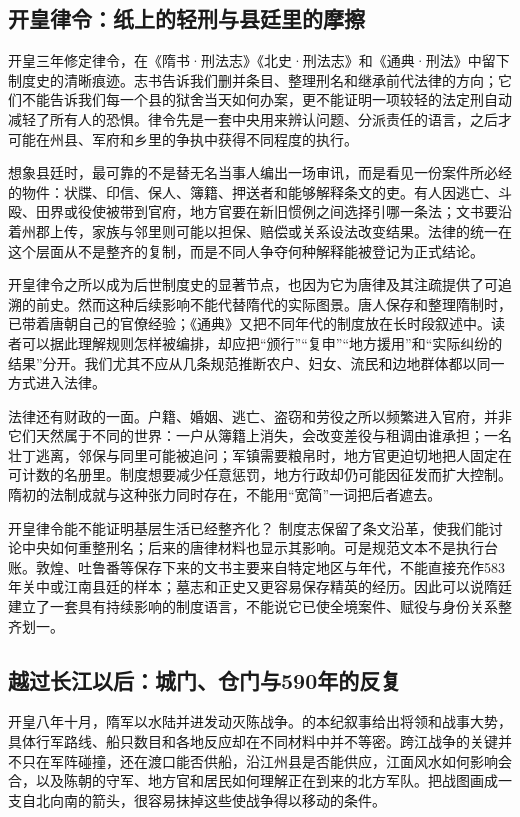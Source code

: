 \subsection{开皇律令：纸上的轻刑与县廷里的摩擦}
开皇三年修定律令，在《隋书·刑法志》《北史·刑法志》和《通典·刑法》中留下制度史的清晰痕迹。志书告诉我们删并条目、整理刑名和继承前代法律的方向；它们不能告诉我们每一个县的狱舍当天如何办案，更不能证明一项较轻的法定刑自动减轻了所有人的恐惧。律令先是一套中央用来辨认问题、分派责任的语言，之后才可能在州县、军府和乡里的争执中获得不同程度的执行。

想象县廷时，最可靠的不是替无名当事人编出一场审讯，而是看见一份案件所必经的物件：状牒、印信、保人、簿籍、押送者和能够解释条文的吏。有人因逃亡、斗殴、田界或役使被带到官府，地方官要在新旧惯例之间选择引哪一条法；文书要沿着州郡上传，家族与邻里则可能以担保、赔偿或关系设法改变结果。法律的统一在这个层面从不是整齐的复制，而是不同人争夺何种解释能被登记为正式结论。

开皇律令之所以成为后世制度史的显著节点，也因为它为唐律及其注疏提供了可追溯的前史。然而这种后续影响不能代替隋代的实际图景。唐人保存和整理隋制时，已带着唐朝自己的官僚经验；《通典》又把不同年代的制度放在长时段叙述中。读者可以据此理解规则怎样被编排，却应把“颁行”“复申”“地方援用”和“实际纠纷的结果”分开。我们尤其不应从几条规范推断农户、妇女、流民和边地群体都以同一方式进入法律。

法律还有财政的一面。户籍、婚姻、逃亡、盗窃和劳役之所以频繁进入官府，并非它们天然属于不同的世界：一户从簿籍上消失，会改变差役与租调由谁承担；一名壮丁逃离，邻保与同里可能被追问；军镇需要粮帛时，地方官更迫切地把人固定在可计数的名册里。制度想要减少任意惩罚，地方行政却仍可能因征发而扩大控制。隋初的法制成就与这种张力同时存在，不能用“宽简”一词把后者遮去。

\begin{debate}{开皇律令能不能证明基层生活已经整齐化？}
制度志保留了条文沿革，使我们能讨论中央如何重整刑名；后来的唐律材料也显示其影响。可是规范文本不是执行台账。敦煌、吐鲁番等保存下来的文书主要来自特定地区与年代，不能直接充作583年关中或江南县廷的样本；墓志和正史又更容易保存精英的经历。因此可以说隋廷建立了一套具有持续影响的制度语言，不能说它已使全境案件、赋役与身份关系整齐划一。
\end{debate}

\subsection{越过长江以后：城门、仓门与590年的反复}
开皇八年十月，隋军以水陆并进发动灭陈战争。的本纪叙事给出将领和战事大势，具体行军路线、船只数目和各地反应却在不同材料中并不等密。跨江战争的关键并不只在军阵碰撞，还在渡口能否供船，沿江州县是否能供应，江面风水如何影响会合，以及陈朝的守军、地方官和居民如何理解正在到来的北方军队。把战图画成一支自北向南的箭头，很容易抹掉这些使战争得以移动的条件。

